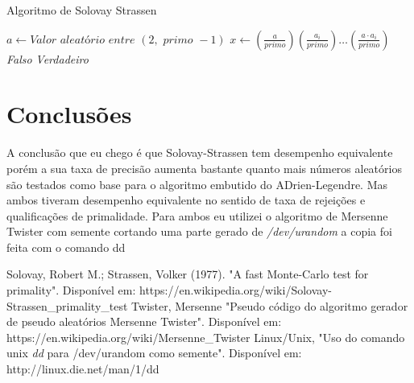 \documentclass[conference]{IEEEtran}
\begin{document}
\begin{algorithm}
  \caption{Algoritmo de Solovay Strassen}
  \begin{algorithmic}
      \vfil
      \vfil
      \vfil
        \vfil
        \State $a \gets \textit{Valor aleatório entre }
               (2, \textit{ primo } - 1)$
        \vfil
        \State $x \gets \left(\frac{a}{primo} \right) \left( \frac{a_i}{primo}
                  \right) \dots \left( \frac{a \cdot a_i}{primo}\right)$
        \vfil
        \vfil
      \EndWhile
      \vfil
        \State \Return \textit{Falso}
      \EndIf
      \vfil
      \State \Return \textit{Verdadeiro}
    \EndFunction
  \end{algorithmic}
\end{algorithm}

\section{Conclusões}

A conclusão que eu chego é que Solovay-Strassen tem desempenho equivalente porém
a sua taxa de precisão aumenta bastante quanto mais números aleatórios são
testados como base para o algoritmo embutido do ADrien-Legendre. Mas ambos
tiveram desempenho equivalente no sentido de taxa de rejeições e qualificações
de primalidade. Para ambos eu utilizei o algoritmo de Mersenne
Twister\cite{mersenne} com semente cortando uma parte gerado de
\textit{/dev/urandom} a copia foi feita com o comando dd

\begin{thebibliography}{1}
   Solovay, Robert M.; Strassen, Volker (1977). "A fast
  Monte-Carlo test for primality". Disponível em:
  https://en.wikipedia.org/wiki/Solovay-Strassen\_primality\_test
   Twister, Mersenne "Pseudo código do algoritmo gerador de
  pseudo aleatórios Mersenne Twister". Disponível em:
  https://en.wikipedia.org/wiki/Mersenne\_Twister
   Linux/Unix, "Uso do comando unix \textit{dd} para /dev/urandom
  como semente". Disponível em: http://linux.die.net/man/1/dd
\end{thebibliography}

\smallskip
\end{document}
